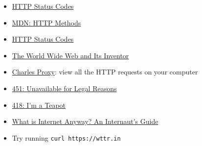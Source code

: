 \begin{itemize}[leftmargin=*]
    \item \href{https://httpstatuses.com}{HTTP Status Codes}
    \item \href{https://developer.mozilla.org/en-US/docs/Web/HTTP/Methods}{MDN: HTTP Methods}
    \item \href{https://www.restapitutorial.com/httpstatuscodes.html}{HTTP Status Codes}
    \item \href{https://twobithistory.org/2018/06/10/birth-of-the-web.html}{The World Wide Web and Its Inventor}
    \item \href{https://www.charlesproxy.com}{Charles Proxy}: view all the HTTP requests on your computer
    \item \href{https://evertpot.com/http/451-unavailable-for-legal-reasons}{451: Unavailable for Legal Reasons}
    \item \href{https://developer.mozilla.org/en-US/docs/Web/HTTP/Status/418}{418: I'm a Teapot}
    \item \href{https://www.youtube.com/watch?v=6iYfvshY4e0}{What is Internet Anyway? An Internaut's Guide}
    \item Try running \texttt{curl https://wttr.in}
\end{itemize}

